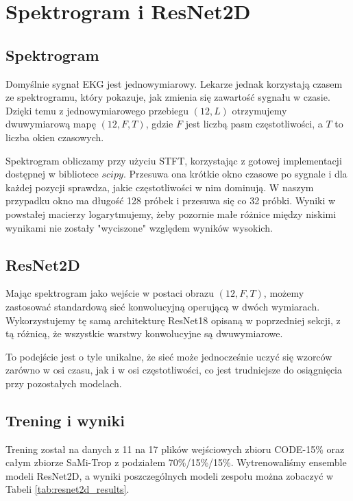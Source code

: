 \section{Spektrogram i ResNet2D}

\subsection{Spektrogram}
Domyślnie sygnał EKG jest jednowymiarowy. Lekarze jednak korzystają czasem ze spektrogramu, 
który pokazuje, jak zmienia się zawartość sygnału w czasie. Dzięki temu z jednowymiarowego przebiegu $(12, L)$
otrzymujemy dwuwymiarową mapę $(12, F, T)$, gdzie $F$ jest liczbą pasm częstotliwości, a $T$
to liczba okien czasowych.

Spektrogram obliczamy przy użyciu STFT,
korzystając z gotowej implementacji dostępnej w bibliotece $scipy$.
Przesuwa ona krótkie okno czasowe po sygnale i dla każdej pozycji sprawdza,
jakie częstotliwości w nim dominują. W naszym przypadku okno ma długość 128 próbek
i przesuwa się co 32 próbki. Wyniki w powstałej macierzy logarytmujemy, żeby pozornie
małe różnice między niskimi wynikami nie zostały "wyciszone" względem wyników wysokich.

\subsection{ResNet2D}
Mając spektrogram jako wejście w postaci obrazu $(12, F, T)$, możemy zastosować
standardową sieć konwolucyjną operującą w dwóch wymiarach. Wykorzystujemy tę
samą architekturę ResNet18 opisaną w poprzedniej sekcji, z tą różnicą, że
wszystkie warstwy konwolucyjne są dwuwymiarowe.

To podejście jest o tyle unikalne, że sieć może jednocześnie uczyć się
wzorców zarówno w osi czasu, jak i w osi częstotliwości, co jest trudniejsze
do osiągnięcia przy pozostałych modelach.


\subsection*{Trening i wyniki}
Trening został na danych z 11 na 17 plików wejściowych zbioru CODE-15\% oraz całym zbiorze SaMi-Trop z podziałem 70\%/15\%/15\%.
Wytrenowaliśmy ensemble modeli ResNet2D, a wyniki
poszczególnych modeli zespołu można zobaczyć w Tabeli \ref{tab:resnet2d_results}.

